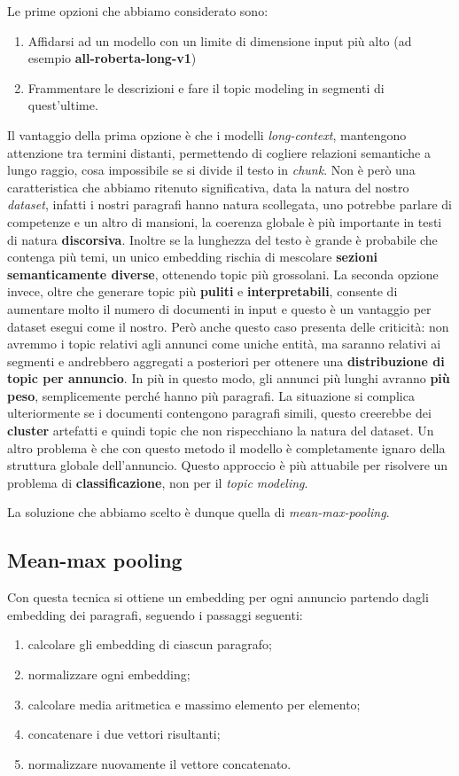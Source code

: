 \noindent Le prime opzioni che abbiamo considerato sono:
\begin{enumerate}
    \item Affidarsi ad un modello con un limite di dimensione input più alto (ad esempio \textbf{all-roberta-long-v1})
    \item Frammentare le descrizioni e fare il topic modeling in segmenti di quest'ultime.
\end{enumerate}
Il vantaggio della prima opzione è che i modelli \textit{long-context}, mantengono attenzione tra termini distanti, permettendo di cogliere relazioni semantiche a lungo raggio, cosa impossibile se si divide il testo in \textit{chunk}.
Non è però una caratteristica che abbiamo ritenuto significativa, data la natura del nostro \textit{dataset}, infatti i nostri paragrafi hanno natura scollegata, uno potrebbe parlare di competenze e un altro di mansioni, la coerenza globale è più importante in testi di natura \textbf{discorsiva}.
Inoltre se la lunghezza del testo è grande è probabile che contenga più temi, un unico embedding rischia di mescolare \textbf{sezioni semanticamente diverse}, ottenendo topic più grossolani.
La seconda opzione invece, oltre che generare topic più \textbf{puliti} e \textbf{interpretabili}, consente di aumentare molto il numero di documenti in input e questo è un vantaggio per dataset esegui come il nostro.
Però anche questo caso presenta delle criticità: non avremmo i topic relativi agli annunci come uniche entità, ma saranno relativi ai segmenti e andrebbero aggregati a posteriori per ottenere una \textbf{distribuzione di topic per annuncio}. In più in questo modo, gli annunci più lunghi avranno \textbf{più peso}, semplicemente perché hanno più paragrafi. La situazione si complica ulteriormente se i documenti contengono paragrafi simili, questo creerebbe dei \textbf{cluster} artefatti e quindi topic che non rispecchiano la natura del dataset. Un altro problema è che con questo metodo il modello è completamente ignaro della struttura globale dell'annuncio.
Questo approccio è più attuabile per risolvere un problema di \textbf{classificazione}, non per il \textit{topic modeling}.\medskip

\noindent La soluzione che abbiamo scelto è dunque quella di \textit{mean-max-pooling}.
\subsection{Mean-max pooling}

\noindent Con questa tecnica si ottiene un embedding per ogni annuncio partendo dagli embedding dei paragrafi, seguendo i passaggi seguenti:
\begin{enumerate}
    \item calcolare gli embedding di ciascun paragrafo;
    \item normalizzare ogni embedding;
    \item calcolare media aritmetica e massimo elemento per elemento;
    \item concatenare i due vettori risultanti;
    \item normalizzare nuovamente il vettore concatenato.
\end{enumerate}

